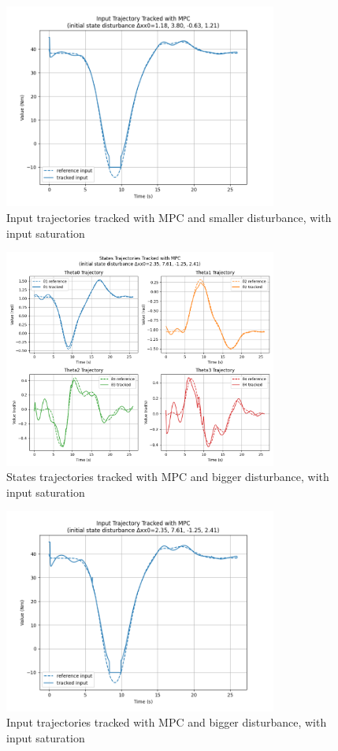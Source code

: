 \documentclass[a4paper,11pt,oneside]{book}
\begin{document}
\begin{figure}[H]
    \centering
    \includegraphics[width=0.8\textwidth]{Input_traj_MPC_AD1_T4.png}
    \caption{Input trajectories tracked with MPC and smaller disturbance, with input saturation}
    \label{fig:enter-label}
\end{figure}
\begin{figure}[H]
    \centering
    \includegraphics[width=0.8\textwidth]{state_traj_MPC_AD2_T4.png}
    \caption{States trajectories tracked with MPC and bigger disturbance, with input saturation}
    \label{fig:enter-label}
\end{figure}
\begin{figure}[H]
    \centering
    \includegraphics[width=0.8\textwidth]{input_traj_MPC_AD2_T4.png}
    \caption{Input trajectories tracked with MPC and bigger disturbance, with input saturation}
    \label{fig:enter-label}
\end{figure}
\end{document}

